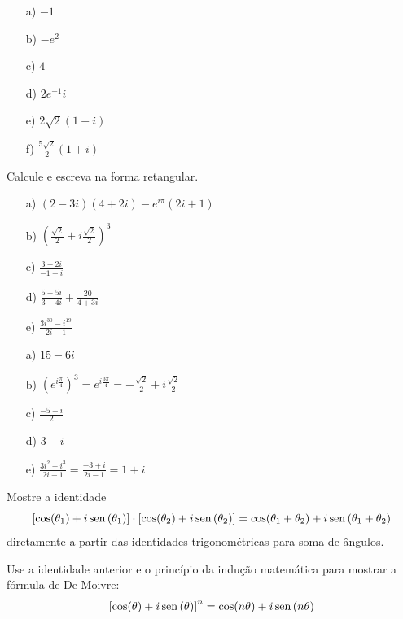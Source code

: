 \begin{resp}
\begin{itemize}
\item[a)] $-1$
\item[b)] $-e^2$
\item[c)] $4$
\item[d)] $2e^{-1}i$
\item[e)] $2\sqrt{2}\left(1-i\right)$
\item[f)] $\frac{5\sqrt{2}}{2}\left(1+i\right)$
\end{itemize}
 \end{resp}
\begin{exer}Calcule e escreva na forma retangular.
\begin{itemize}
\item[a)] $(2-3i)(4+2i)-e^{i\pi }(2i+1)$
\item[b)] $\left(\frac{\sqrt{2}}{2}+i\frac{\sqrt{2}}{2}\right)^3$
\item[c)] $\frac{3-2i}{-1+i}$
\item[d)] $\frac{5+5i}{3-4i}+\frac{20}{4+3i}$
\item[e)] $\frac{3i^{30}-i^{19}}{2i-1}$
\end{itemize}
\end{exer}
\begin{resp}
\begin{itemize}
\item [a)]$15-6i$
\item [b)]$\left(e^{i\frac{\pi}{4}}\right)^3=e^{i\frac{3\pi}{4}}=-\frac{\sqrt{2}}{2}+i\frac{\sqrt{2}}{2}$
\item [c)]$\frac{-5-i}{2}$
\item [d)]$3-i$
\item [e)]$\frac{3i^{2}-i^{3}}{2i-1}=\frac{-3+i}{2i-1}=1+i$
\end{itemize}
\end{resp}
\begin{exer}Mostre a identidade 
\begin{equation}\left[\cos(\theta_1)+i\operatorname{sen}\,(\theta_1)\right]\cdot\left[\cos(\theta_2)+i\operatorname{sen}\,(\theta_2)\right]=\cos(\theta_1+\theta_2)+i\operatorname{sen}\,(\theta_1+\theta_2)\end{equation}
diretamente a partir das identidades trigonométricas para soma de ângulos.
\end{exer}
\begin{exer}Use a identidade anterior e o princípio da indução matemática para mostrar a fórmula de De Moivre:
\begin{equation}\left[\cos(\theta)+i\operatorname{sen}\,(\theta)\right]^n=\cos(n\theta)+i\operatorname{sen}\,(n\theta)\end{equation}
\end{exer}
